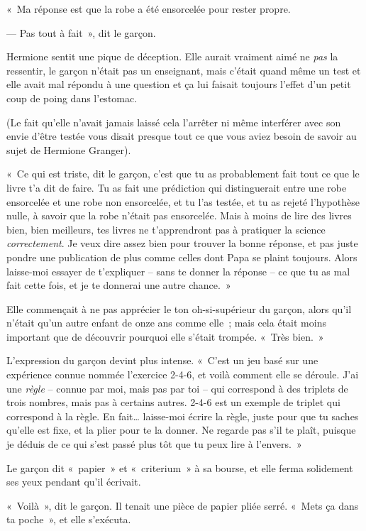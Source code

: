 «~Ma réponse est que la robe a été ensorcelée pour rester propre.

--- Pas tout à fait~», dit le garçon.

Hermione sentit une pique de déception. Elle aurait vraiment aimé ne \emph{pas} la ressentir, le garçon n'était pas un enseignant, mais c'était quand même un test et elle avait mal répondu à une question et ça lui faisait toujours l'effet d'un petit coup de poing dans l'estomac.

(Le fait qu'elle n'avait jamais laissé cela l'arrêter ni même interférer avec son envie d'être testée vous disait presque tout ce que vous aviez besoin de savoir au sujet de Hermione Granger).

«~Ce qui est triste, dit le garçon, c'est que tu as probablement fait tout ce que le livre t'a dit de faire. Tu as fait une prédiction qui distinguerait entre une robe ensorcelée et une robe non ensorcelée, et tu l'as testée, et tu as rejeté l'hypothèse nulle, à savoir que la robe n'était pas ensorcelée. Mais à moins de lire des livres bien, bien meilleurs, tes livres ne t'apprendront pas à pratiquer la science \emph{correctement}. Je veux dire assez bien pour trouver la bonne réponse, et pas juste pondre une publication de plus comme celles dont Papa se plaint toujours. Alors laisse-moi essayer de t'expliquer -- sans te donner la réponse -- ce que tu as mal fait cette fois, et je te donnerai une autre chance.~»

Elle commençait à ne pas apprécier le ton oh-si-supérieur du garçon, alors qu'il n'était qu'un autre enfant de onze ans comme elle~; mais cela était moins important que de découvrir pourquoi elle s'était trompée. «~Très bien.~»

L'expression du garçon devint plus intense. «~C'est un jeu basé sur une expérience connue nommée l'exercice 2-4-6, et voilà comment elle se déroule. J'ai une \emph{règle} -- connue par moi, mais pas par toi -- qui correspond à des triplets de trois nombres, mais pas à certains autres. 2-4-6 est un exemple de triplet qui correspond à la règle. En fait… laisse-moi écrire la règle, juste pour que tu saches qu'elle est fixe, et la plier pour te la donner. Ne regarde pas s'il te plaît, puisque je déduis de ce qui s'est passé plus tôt que tu peux lire à l'envers.~»

Le garçon dit «~papier~» et «~criterium~» à sa bourse, et elle ferma solidement ses yeux pendant qu'il écrivait.

«~Voilà~», dit le garçon. Il tenait une pièce de papier pliée serré. «~Mets ça dans ta poche~», et elle s'exécuta.

